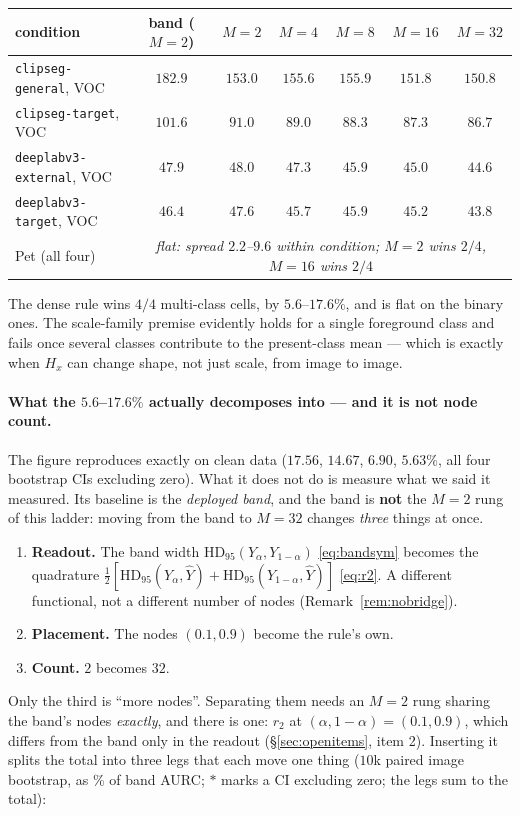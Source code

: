 \documentclass[11pt]{article}
\theoremstyle{remark}
\newcommand{\Yhat}{\widehat{Y}}
\newcommand{\Ylo}{Y_{\alpha}}
\newcommand{\Yhi}{Y_{1-\alpha}}
\newcommand{\HDF}{\mathrm{HD}_{95}}
\begin{document}
\begin{center}
\small
\begin{tabular}{lcccccc}
\toprule
condition & band ($M{=}2$) & $M{=}2$ & $M{=}4$ & $M{=}8$ & $M{=}16$ & $M{=}32$ \\
\midrule
\texttt{clipseg-general}, VOC   & $182.9$ & $153.0$ & $155.6$ & $155.9$ & $151.8$ & $\mathbf{150.8}$ \\
\texttt{clipseg-target}, VOC    & $101.6$ & $91.0$  & $89.0$  & $88.3$  & $87.3$  & $\mathbf{86.7}$ \\
\texttt{deeplabv3-external}, VOC& $47.9$  & $48.0$  & $47.3$  & $45.9$  & $45.0$  & $\mathbf{44.6}$ \\
\texttt{deeplabv3-target}, VOC  & $46.4$  & $47.6$  & $45.7$  & $45.9$  & $45.2$  & $\mathbf{43.8}$ \\
\midrule
Pet (all four)                  & \multicolumn{6}{c}{\emph{flat: spread $2.2$--$9.6$ within condition; $M{=}2$ wins $2/4$, $M{=}16$ wins $2/4$}} \\
\bottomrule
\end{tabular}
\end{center}

The dense rule wins $4/4$ multi-class cells, by $5.6$--$17.6\%$, and is flat on the
binary ones. The scale-family premise evidently holds for a single foreground class
and fails once several classes contribute to the present-class mean --- which is
exactly when $H_x$ can change shape, not just scale, from image to image.

\paragraph{What the $5.6$--$17.6\%$ actually decomposes into --- and it is not node
count.} The figure reproduces exactly on clean data ($17.56$, $14.67$, $6.90$, $5.63\%$,
all four bootstrap CIs excluding zero). What it does not do is measure what we said it
measured. Its baseline is the \emph{deployed band}, and the band is \textbf{not} the
$M{=}2$ rung of this ladder: moving from the band to $M{=}32$ changes \emph{three} things
at once.
\begin{enumerate}
\item \textbf{Readout.} The band width $\HDF(\Ylo,\Yhi)$ \eqref{eq:bandsym} becomes the
quadrature $\tfrac12[\HDF(\Ylo,\Yhat)+\HDF(\Yhi,\Yhat)]$ \eqref{eq:r2}. A different
functional, not a different number of nodes (Remark~\ref{rem:nobridge}).
\item \textbf{Placement.} The nodes $(0.1, 0.9)$ become the rule's own.
\item \textbf{Count.} $2$ becomes $32$.
\end{enumerate}
Only the third is ``more nodes''. Separating them needs an $M{=}2$ rung sharing the
band's nodes \emph{exactly}, and there is one: $r_2$ at $(\alpha, 1-\alpha) = (0.1,
0.9)$, which differs from the band only in the readout (\S\ref{sec:openitems}, item 2).
Inserting it splits the total into three legs that each move one thing ($10$k paired
image bootstrap, as \% of band AURC; $*$ marks a CI excluding zero; the legs sum to the
total):
\end{document}
